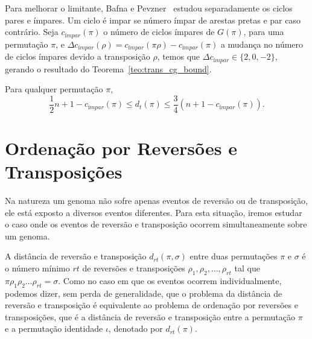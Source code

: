 Para melhorar o limitante, Bafna e Pevzner~\cite{BafnaPevzner*1998}
estudou separadamente os ciclos pares e ímpares. Um ciclo é impar se
número ímpar de arestas pretas e par caso contrário. Seja
$c_{ímpar}(\pi)$ o número de ciclos ímpares de $G(\pi)$, para uma
permutação $\pi$, e $\Delta c_{ímpar} (\rho) = c_{ímpar} (\pi \rho) -
c_{ímpar} (\pi)$ a mudança no número de ciclos ímpares devido a
transposição $\rho$, temos que $\Delta c_{ímpar} \in \{2, 0, -2\}$,
gerando o resultado do Teorema~\ref{teo:trans_cg_bound}.

\begin{teo} 
  \label{teo:trans_cg_bound} 
  Para qualquer permutação $\pi$, 
  \[ 
  \frac{1}{2}n + 1 - c_{ímpar}(\pi) \leq d_t(\pi) \leq \frac{3}{4} (n
  + 1 - c_{ímpar}(\pi)).
  \]
\end{teo}

\section{Ordenação por Reversões e Transposições}
\label{sec:rev_trans}
Na natureza um genoma não sofre apenas eventos de reversão ou de
transposição, ele está exposto a diversos eventos diferentes. Para
esta situação, iremos estudar o caso onde os eventos de reversão e
transposição ocorrem simultaneamente sobre um genoma.

A distância de reversão e transposição $d_{rt}(\pi, \sigma)$ entre
duas permutações $\pi$ e $\sigma$ é o número mínimo $rt$ de reversões
e transposições $\rho_{1}, \rho_{2}, \ldots, \rho_{rt}$ tal que
$\pi \rho_{1} \rho_{2} \ldots \rho_{rt} = \sigma$. Como no caso em que
os eventos ocorrem individualmente, podemos dizer, sem perda de
generalidade, que o problema da distância de reversão e transposição é
equivalente ao problema de ordenação por reversões e transposições,
que é a distância de reversão e transposição entre a permutação $\pi$ e a
permutação identidade $\iota$, denotado por $d_{rt}(\pi)$.


